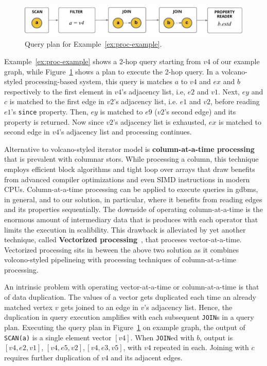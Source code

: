 \begin{figure}
	\hfill\includegraphics[scale=0.78]{img/proc-qp}\hfill
	\vspace{-10pt}
	\caption{Query plan for Example~\ref{ex:proc-example}.}
	\vspace{-8pt}
	\label{fig:proc-qp}
\end{figure}

Example~\ref{ex:proc-example} shows a 2-hop query starting from $v4$ of our example graph, while Figure~\ref{fig:proc-qp} shows a plan to execute the 2-hop query. In a volcano-styled processing-based system, this query is matches $a$ to $v4$ and $ex$ and $b$ respectively to the first element in $v4$'s adjacency list, i.e, $e2$ and $v1$. Next, $ey$ and $c$ is matched to the first edge in $v2$'s adjacency list, i.e. $e1$ and $v2$, before reading $e1$'s \texttt{since} property. Then, $ey$ is matched to $e9$ ($v2$'s second edge) and its property is returned. Now since $v2$'s adjacency list is exhausted, $ex$ is matched to second edge in $v4$'s adjacency list and processing continues. 

Alternative to volcano-styled iterator model is \textbf{column-at-a-time processing}~\cite{boncz-phd, monet-2decades} that is prevalent with columnar stors. While processing a column, this technique employs efficient block algorithms and tight loop over arrays that draw benefits from advanced compiler optimizations and even SIMD instructions in modern CPUs. Column-at-a-time processing can be applied to execute queries in \gls{gdbms}, in general, and to our solution, in particular, where it benefits from reading edges and its properties sequentially. The downside of operating column-at-a-time is the enormous amount of intermediary data that is produces with each operator that limits the execution in scalibility. This drawback is alleviated by yet another technique, called \textbf{Vectorized processing}~\cite{boncz-vectorwise1, boncz-monet-vectorized, boncz-vectorwise, dbms-cache}, that proceses vector-at-a-time. Vectorized processing sits in beween the above two solution as it combines volcono-styled pipelineing with processing techniques of column-at-a-time processing. 

An intrinsic problem with operating vector-at-a-time or column-at-a-time is that of data duplication. The values of a vector gets duplicated each time an already matched vertex $v$ gets joined to an edge in $v$'s adjacency list. Hence, the duplication in query execution amplifies with each subsequent \texttt{JOIN}s in a query plan. Executing the query plan in Figure~\ref{fig:proc-qp} on example graph, the output of \texttt{SCAN(a)} is a single element vector $[v4]$. When \texttt{JOIN}ed with $b$, output is $[v4, e2, v1]$, $[v4, e5, v2], [v4, e3, v5]$, with $v4$ repeated in each. Joining with $c$ requires further duplication of $v4$ and its adjacent edges.

